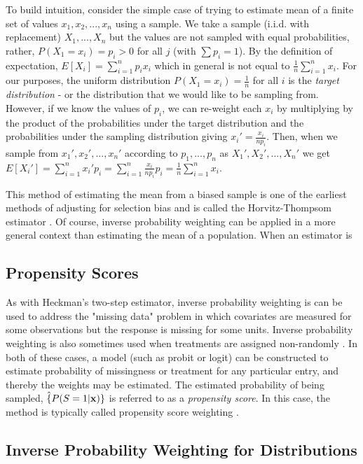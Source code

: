 \documentclass[12pt,twoside]{reedthesis}
\theoremstyle{definition}
\begin{document}
To build intuition, consider the simple case of trying to estimate mean of a finite set of values  $x_1,x_2,...,x_n$ using a sample. We take a sample (i.i.d. with replacement) $X_1,...,X_n$ but the values are not sampled with equal probabilities, rather, $P(X_1 = x_i) = p_i > 0$ for all $j$ (with $\sum p_i = 1$). By the definition of expectation, $E[X_i] = \sum_{i=1}^n p_i x_i$ which in general is not equal to $\frac{1}{n}\sum_{i=1}^n x_i$. For our purposes, the uniform distribution $P(X_1 = x_i) = \frac{1}{n}$ for all $i$ is the \emph{target distribution} - or the distribution that we would like to be sampling from. However, if we know the values of $p_i$, we can re-weight each $x_i$ by multiplying by the product of the probabilities under the target distribution and the probabilities under the sampling distribution giving $x_i' = \frac{x_i}{np_i}$. Then, when we sample from $x_1', x_2', ..., x_n'$ according to $p_1,...,p_n$ as $X_1', X_2', ..., X_n'$ we get $E[X_i'] = \sum_{i=1}^n x_i' p_i = \sum_{i=1}^n  \frac{x_i}{n p_i} p_i = \frac{1}{n} \sum_{i=1}^n x_i$. 

This method of estimating the mean from a biased sample is one of the earliest methods of adjusting for selection bias and is called the Horvitz-Thompsom estimator \citep{Little_1986}. Of course, inverse probability weighting can be applied in a more general context than estimating the mean of a population. When an estimator is


\subsection{Propensity Scores}

As with Heckman's two-step estimator, inverse probability weighting is can be used to address the "missing data" problem in which covariates are measured for some observations but the response is missing for some units. Inverse probability weighting is also sometimes used when treatments are assigned non-randomly \citep{Haneuse_2009}.  In both of these cases, a model (such as probit or logit) can be constructed to estimate probability of missingness or treatment for any particular entry, and thereby the weights may be estimated. The estimated probability of being sampled, $\hat\{P(S = 1 | \mathbf{x})\}$ is referred to as a \emph{propensity score}. In this case, the method is typically called propensity score weighting \citep{Bishop_2018}. 


\subsection{Inverse Probability Weighting for Distributions}
\end{document}
